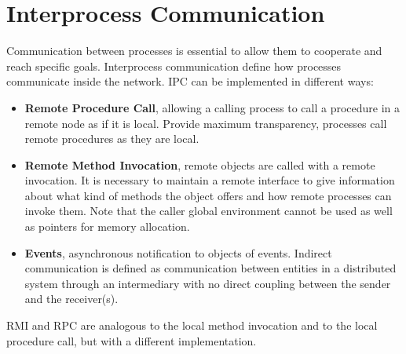 \documentclass[11pt,a4paper]{article}
\begin{document}
\section{Interprocess Communication}
Communication between processes is essential to allow them to cooperate and reach specific goals. Interprocess communication define how processes communicate inside the network. IPC can be implemented in different ways:
\begin{itemize}
	\item \textbf{Remote Procedure Call}, allowing a calling process to call a procedure in a remote node as if it is local. Provide maximum transparency, processes call remote procedures as they are local.
	\item \textbf{Remote Method Invocation}, remote objects are called with a remote invocation. It is necessary to maintain a remote interface to give information about what kind of methods the object offers and how remote processes can invoke them. Note that the caller global environment cannot be used as well as pointers for memory allocation.
	\item \textbf{Events}, asynchronous notification to objects of events. Indirect communication is defined as communication between entities in a distributed system through an intermediary with no direct coupling between the sender and the receiver(s).
\end{itemize}
RMI and RPC are analogous to the local method invocation and to the local procedure call, but with a different implementation.
\end{document}
